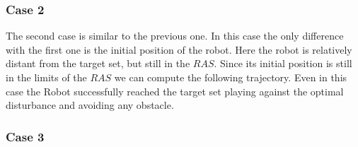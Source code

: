 \subsubsection{Case 2}
The second case is similar to the previous one. In this case the only difference with the first one is the initial position of the robot. Here the robot is relatively distant from the target set, but still in the $RAS$. 
Since its initial position is still in the limits of the $RAS$ we can compute the following trajectory.
Even in this case the Robot successfully reached the target set playing against the optimal disturbance and avoiding any obstacle.

\subsubsection{Case 3}
        